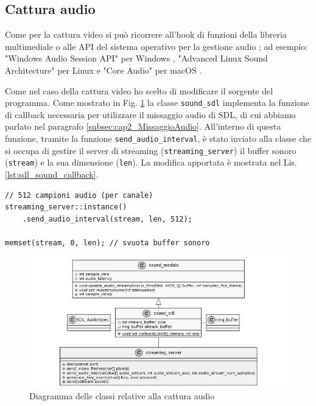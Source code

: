 \subsection{Cattura audio} \label{subsec:cap3_Audio}
Come per la cattura video si può ricorrere all'hook di funzioni della libreria multimediale o alle API del sistema operativo per la gestione audio \parencite{GamingAnywhere}; ad esempio: "Windows Audio Session API" per Windows \parencite{WASAPI}, "Advanced Linux Sound Architecture" per Linux \parencite{ALSA} e "Core Audio" per macOS \parencite{Core_Audio_api}.

Come nel caso della cattura video ho scelto di modificare il sorgente del programma. Come mostrato in Fig. \ref{fig:class_mixingSDL_streaming} la classe \verb|sound_sdl| implementa la funzione di callback necessaria per utilizzare il missaggio audio di SDL, di cui abbiamo parlato nel paragrafo \ref{subsec:cap2_MissaggioAudio}. All'interno di questa funzione, tramite la funzione \verb|send_audio_interval|, è stato inviato alla classe che si occupa di gestire il server di streaming (\verb|streaming_server|) il buffer sonoro (\verb|stream|) e la sua dimensione (\verb|len|). La modifica apportata è mostrata nel Lis. \ref{lst:sdl_sound_callback}.

\begin{lstlisting}[caption=Codice aggiunto per la cattura audio. File: \detokenize{osd/modules/sound/sdl_sound.cpp}, label={lst:sdl_sound_callback}]
// 512 campioni audio (per canale)
streaming_server::instance()
	.send_audio_interval(stream, len, 512);

memset(stream, 0, len); // svuota buffer sonoro
\end{lstlisting}


\begin{figure}[H]
	\includegraphics[width=\linewidth]{immagini/class_mixingSDL_streaming}
	\caption{Diagramma delle classi relative alla cattura audio}
	\label{fig:class_mixingSDL_streaming}
\end{figure}



